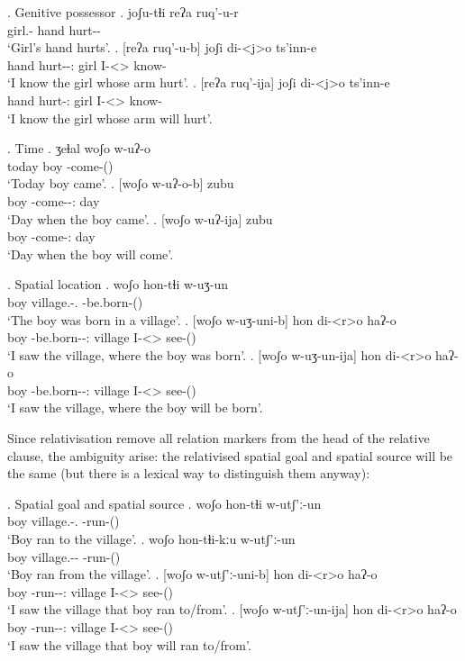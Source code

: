 \ex. Genitive possessor
	\ag. joʃu-tɬi reʔa ruq'-u-r\\
			{girl.\Obl-\Gen} hand {hurt-\Pst-\Prog}\\
			\glt `Girl's hand hurts'.
	\bg. [reʔa ruq'-u-b] joʃi di-<j>o ts'inn-e\\
			hand {hurt-\Pst-\Ptcp:\Pst} girl {I-<\F>\Aff} {know-\Hab}\\
			\glt `I know the girl whose arm hurt'.
	\bg. [reʔa ruq'-ija] joʃi di-<j>o ts'inn-e\\
			hand {hurt-\Ptcp:\Pres} girl {I-<\F>\Aff} {know-\Hab}\\
			\glt `I know the girl whose arm will hurt'.
			
\ex. Time
	\ag. ʒeɬal woʃo w-uʔ-o\\
			today {boy} {\M-come-\Pst(\Aor)}\\
			\glt `Today boy came'.	
	\bg. [woʃo w-uʔ-o-b] zubu\\
			{boy} {\M-come-\Pst-\Ptcp:\Pst} day\\
			\glt `Day when the boy came'.	
	\bg. [woʃo w-uʔ-ija] zubu\\
			{boy} {\M-come-\Ptcp:\Pres} day\\
			\glt `Day when the boy will come'.	

\ex. Spatial location
	\ag. woʃo hon-tɬi w-uʒ-un\\
			boy {village.\Obl-\Inter.\Ess} {\M-be.born-\Pst(\Aor)}\\
			\glt `The boy was born in a village'.
	\bg. [woʃo w-uʒ-uni-b] hon di-<r>o haʔ-o\\
			boy {\M-be.born-\Pst-\Ptcp:\Pst} village {I-<\Nans>\Aff} {see-\Pst(\Aor)}\\
			\glt `I saw the village, where the boy was born'.
	\bg. [woʃo w-uʒ-un-ija] hon di-<r>o haʔ-o\\
			boy {\M-be.born-\Npst-\Ptcp:\Pres} village {I-<\Nans>\Aff} {see-\Pst(\Aor)}\\
			\glt `I saw the village, where the boy will be born'.
			
Since relativisation remove all relation markers from the head of the relative clause, the ambiguity arise: the relativised spatial goal and spatial source will be the same (but there is a lexical way to distinguish them anyway):

\ex. Spatial goal and spatial source
	\ag. woʃo hon-tɬi w-utʃ'ː-un\\
			boy {village.\Obl-\Inter.\Lat} {\M-run-\Pst(\Aor)}\\
			\glt `Boy ran to the village'.
	\bg. woʃo hon-tɬi-kːu w-utʃ'ː-un\\
			boy {village.\Obl-\Inter-\Elat} {\M-run-\Pst(\Aor)}\\
			\glt `Boy ran from the village'.
	\bg. [woʃo w-utʃ'ː-uni-b] hon di-<r>o haʔ-o\\
			boy {\M-run-\Pst-\Ptcp:\Pst} village {I-<\Nans>\Aff} {see-\Pst(\Aor)}\\
			\glt `I saw the village that boy ran to/from'.
	\bg. [woʃo w-utʃ'ː-un-ija] hon di-<r>o haʔ-o\\
			boy {\M-run-\Npst-\Ptcp:\Pres} village {I-<\Nans>\Aff} {see-\Pst(\Aor)}\\
			\glt `I saw the village that boy will ran to/from'.

